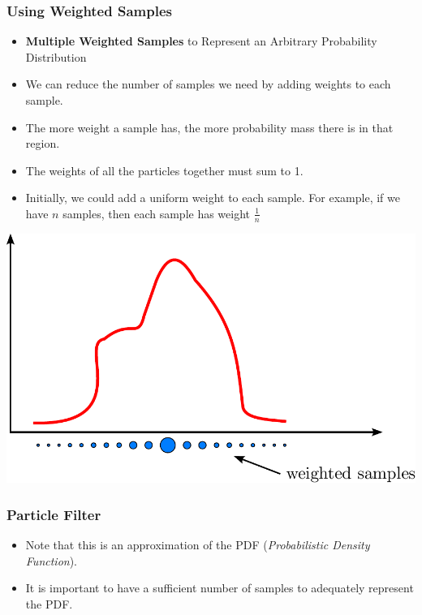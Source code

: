 \begin{frame}
    \frametitle{Using Weighted Samples}
    \footnotesize
    \begin{itemize}
        \item \textbf{Multiple Weighted Samples} to Represent an Arbitrary Probability Distribution
        \item We can reduce the number of samples we need by adding weights to each sample.
        \item The more weight a sample has, the more probability mass there is in that region.
        \item The weights of all the particles together must sum to 1.
        \item Initially, we could add a uniform weight to each sample. For example, if we have $n$ samples, then each sample has weight $\frac{1}{n}$
    \end{itemize}

    \begin{center}
        \includegraphics[width=0.5\columnwidth]{./images/particle_filter/arbitrary_distribution_weighted_samples.pdf}
    \end{center}

\end{frame}
    
\begin{frame}
    \frametitle{Particle Filter}
    
    \footnotesize
    \begin{itemize}
        \item Note that this is an approximation of the PDF (\emph{Probabilistic Density Function}).
        \item It is important to have a sufficient number of samples to adequately represent the PDF.
    \end{itemize}

\end{frame}


